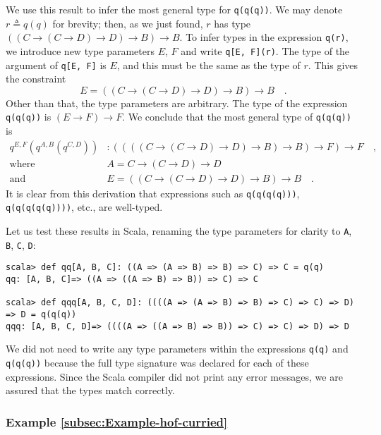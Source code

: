 We use this result to infer the most general type for \lstinline!q(q(q))!.
We may denote $r\triangleq q(q)$ for brevity; then, as we just found,
$r$ has type $\left(\left(C\rightarrow\left(C\rightarrow D\right)\rightarrow D\right)\rightarrow B\right)\rightarrow B$.
To infer types in the expression \lstinline!q(r)!, we introduce new
type parameters $E$, $F$ and write \lstinline!q[E, F](r)!. The
type of the argument of \lstinline!q[E, F]! is $E$, and this must
be the same as the type of $r$. This gives the constraint
\[
E=\left(\left(C\rightarrow\left(C\rightarrow D\right)\rightarrow D\right)\rightarrow B\right)\rightarrow B\quad.
\]
Other than that, the type parameters are arbitrary. The type of the
expression \lstinline!q(q(q))! is $\left(E\rightarrow F\right)\rightarrow F$.
We conclude that the most general type of \lstinline!q(q(q))! is
\begin{align*}
q^{E,F}(q^{A,B}(q^{C,D})) & :\left(\left(\left(\left(C\rightarrow\left(C\rightarrow D\right)\rightarrow D\right)\rightarrow B\right)\rightarrow B\right)\rightarrow F\right)\rightarrow F\quad,\\
\text{where}\quad & A=C\rightarrow\left(C\rightarrow D\right)\rightarrow D\\
\text{and}\quad & E=\left(\left(C\rightarrow\left(C\rightarrow D\right)\rightarrow D\right)\rightarrow B\right)\rightarrow B\quad.
\end{align*}
It is clear from this derivation that expressions such as \lstinline!q(q(q(q)))!,
\lstinline!q(q(q(q(q))))!, etc., are well-typed.

Let us test these results in Scala, renaming the type parameters for
clarity to \lstinline!A!, \lstinline!B!, \lstinline!C!, \lstinline!D!:
\begin{lstlisting}
scala> def qq[A, B, C]: ((A => (A => B) => B) => C) => C = q(q)
qq: [A, B, C]=> ((A => ((A => B) => B)) => C) => C

scala> def qqq[A, B, C, D]: ((((A => (A => B) => B) => C) => C) => D) => D = q(q(q))
qqq: [A, B, C, D]=> ((((A => ((A => B) => B)) => C) => C) => D) => D
\end{lstlisting}
We did not need to write any type parameters within the expressions
\lstinline!q(q)! and \lstinline!q(q(q))! because the full type signature
was declared for each of these expressions. Since the Scala compiler
did not print any error messages, we are assured that the types match
correctly.

\subsubsection{Example \label{subsec:Example-hof-curried}\ref{subsec:Example-hof-curried}}

